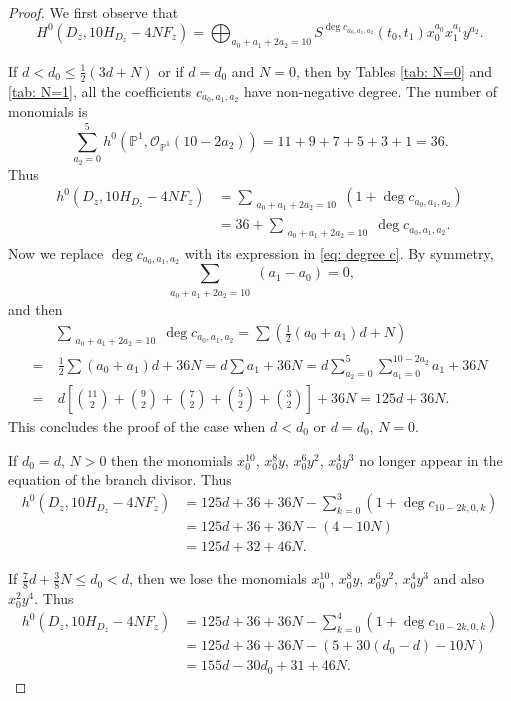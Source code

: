 \documentclass[10pt,a4paper]{amsart}
\newcommand{\PP}{\ensuremath{\mathbb{P}}}
\def\hol{{\mathcal{O}}}
\begin{document}
\begin{proof}
	We first observe that
	\begin{equation} \label{eq: decompose-10H}
		H^0(D_z,10H_{D_z}-4NF_z)=\bigoplus_{a_0+a_1+2a_2=10} S^{\deg c_{a_0,a_1,a_2}}(t_0,t_1)x_0^{a_0}x_1^{a_1}y^{a_2}.
	\end{equation}
    
    If $d < d_0 \le \frac12(3d + N)$ or if $d=d_0$ and $N=0$, then by Tables \ref{tab: N=0} and \ref{tab: N=1}, all the coefficients $c_{a_0,a_1,a_2}$ have non-negative degree. The number of monomials is 
	$$
	\sum_{a_2=0}^5 h^0 \left(\PP^1,\hol_{\PP^1}(10-2a_2)\right)=11+9+7+5+3+1=36.
	$$
    Thus
    \begin{align*}
    h^0(D_z,10H_{D_z}-4NF_z) & =  \sum_{\substack{a_0 + a_1 + 2a_2 = 10}} (1 + \deg c_{a_0,a_1,a_2}) \\
	& = 36 + \sum_{\substack{a_0 + a_1 + 2a_2 = 10}} \deg c_{a_0,a_1,a_2}.
    \end{align*}
    Now we replace $\deg c_{a_0,a_1,a_2}$ with its expression in \eqref{eq: degree c}. By symmetry,
    \[
    \sum_{\substack{a_0 + a_1 + 2a_2 = 10}} (a_1-a_0)=0,
    \] 
    and then
    \begin{align*}
        & \sum_{\substack{a_0 + a_1 + 2a_2 = 10}} \deg c_{a_0,a_1,a_2} = \sum \left( \frac{1}{2} (a_0 + a_1) d +N\right) \\
        = & \ \frac{1}{2}  \sum (a_0 + a_1)d  +36N = d \sum a_1 +36N= d \sum_{a_2=0}^5 \sum_{a_1=0}^{10-2a_2} a_1 + 36N \\
        = & \ d \left[ \binom{11}2 + \binom92+ \binom72+ \binom52+ \binom32 \right]+36N=125d+36N.
    \end{align*}
	This concludes the proof of the case when $d < d_0$ or $d=d_0$, $N=0$.
    
    If $d_0 = d$, $N > 0$ then the monomials $x_0^{10}$, $x_0^8y$, $x_0^6y^2$, $x_0^4y^3$ no longer appear in the equation of the branch divisor. Thus
	\begin{align*}
		h^0(D_z, 10H_{D_z} - 4NF_z) & = 125d + 36 + 36N -\sum_{k=0}^3(1 + \deg c_{10-2k,0,k})\\
		& = 125d + 36 + 36N - \left(4  - 10N \right) \\
		& = 125d  + 32 + 46N.
	\end{align*}

	If $\frac78d + \frac38 N \le d_0 < d$, then we lose the monomials 
    $x_0^{10}$, $x_0^8y$, $x_0^6y^2$, $x_0^4y^3$ and also $x_0^2y^4$. Thus
	\begin{align*}
		h^0(D_z, 10H_{D_z} - 4NF_z) & = 125d + 36 + 36N -\sum_{k=0}^4(1 + \deg c_{10-2k,0,k})\\
		& = 125d + 36 + 36N - \left(5 + 30(d_0-d) - 10N \right) \\
		& = 155d - 30d_0 + 31 + 46N.
	\end{align*}


\end{proof}
\end{document}
